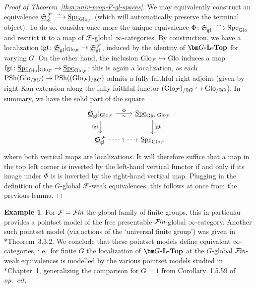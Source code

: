 \documentclass[reqno]{memo-l}
\theoremstyle{mythm}
\theoremstyle{definition}
\newtheorem{ex}[thm]{Example}
\numberwithin{equation}{section}
\newcommand{\Ff}{{\mathcal{F}}}
\newcommand{\gl}{\textup{gl}}
\DeclareMathOperator{\Spc}{Spc}
\DeclareMathOperator{\PSh}{PSh}
\newcommand{\cat}[1]{\textbf{\textup{#1}}}
\newcommand{\fgt}{\textup{fgt}}
\newcommand{\Fin}{\hbox{$\mathcal F\kern-1.7pt\textit{in}$}}
\newcommand{\Glo}{\textup{Glo}}
\newcommand{\BGcat}[1]{\mathbb B{#1}}
\newcommand{\ulhelper}[2]{\underline{\setbox0=\hbox{$#1#2$}\dp0=0.4pt \box0\relax}}
\newcommand{\ul}[1]{{\mathpalette\ulhelper{#1}}\hbox{\rule[-2pt]{0pt}{0pt}}}
\newcommand{\iso}{\xrightarrow{\;\smash{\raisebox{-0.25ex}{\ensuremath{\scriptstyle\sim}}}\;}}
\newcommand{\myS}{{{\mathfrak S\kern-.4pt}}}
\begin{document}
\begin{proof}[Proof of Theorem~\ref{thm:univ-prop-F-gl-spaces}]
    We may equivalently construct an equivalence $\ul\myS_\gl^{\,\Ff}\iso\ul\Spc_{\Glo_\Ff}$ (which will automatically preserve the terminal object). To do so, consider once more the unique equivalence $\Phi\colon\ul\myS_\gl\iso\ul\Spc_\Glo$ and restrict it to a map of $\Ff$-global $\infty$-categories. By construction, we have a localization $\fgt\colon\ul\myS_\gl|_{\Glo_\Ff}\to\ul\myS_\gl^{\,\Ff}$, induced by the identity of $\cat{$\bm G$-$\cat{L}$-Top}$ for varying $G$. On the other hand, the inclusion $\Glo_{\Ff}\hookrightarrow\Glo$ induces a map $\fgt\colon\ul\Spc_{\Glo}|_{\Glo_\Ff}\to\ul\Spc_{\Glo_\Ff}$; this is again a localization, as each $\PSh(\Glo_{/\BGcat{G}})\to\PSh((\Glo_\Ff)_{/\BGcat{G}})$ admits a fully faithful right adjoint (given by right Kan extension along the fully faithful functor $(\Glo_\Ff)_{/\BGcat{G}}\hookrightarrow\Glo_{/\BGcat{G}}$). In summary, we have the solid part of the square
    \[
        \begin{tikzcd}
            \ul\myS_\gl|_{\Glo_\Ff}\arrow[r,"\Phi","\sim"']\arrow[d,"\fgt"'] & \ul\Spc_{\Glo}|_{\Glo_\Ff}\arrow[d,"\fgt"]\\
            \ul\myS_\gl^{\,\Ff}\arrow[r,dashed,"?"{description}] & \ul\Spc_{\Glo_\Ff}
        \end{tikzcd}
    \]
    where both vertical maps are localizations. It will therefore suffice that a map in the top left corner is inverted by the left-hand vertical functor if and only if its image under $\Phi$ is is inverted by the right-hand vertical map. Plugging in the definition of the $G$-global $\Ff$-weak equivalences, this follows at once from the previous lemma.
\end{proof}

\begin{ex}
    For $\Ff=\Fin$ the global family of finite groups, this in particular provides a pointset model of the free presentable $\Fin$-global $\infty$-category. Another such pointset model (via actions of the `universal finite group') was given in \cite{CLL_Global}*{Theorem~3.3.2}. We conclude that these pointset models define equivalent $\infty$-categories, i.e.~for finite $G$ the localization of $\cat{$\bm G$-${\cat L}$-Top}$ at the $G$-global $\Fin$-weak equivalences is modelled by the various pointset models studied in \cite{g-global}*{Chapter~1}, generalizing the comparison for $G=1$ from Corollary~1.5.59 of \emph{op.\ cit.}
\end{ex}
\end{document}
